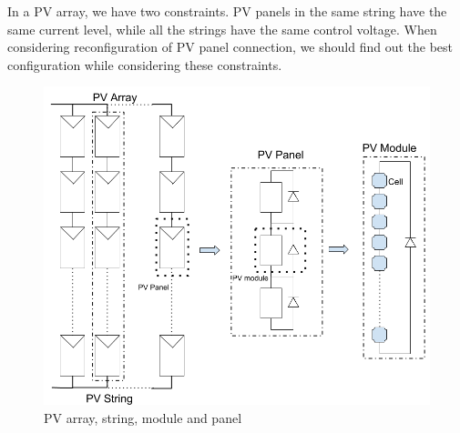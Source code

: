 \documentclass[conference]{pvsctran}
\begin{document}
In a PV array, we have two constraints. 
PV panels in the same string have the same current level, while all the strings have the same control voltage. 
When considering reconfiguration of PV panel connection, we should find out the best configuration while considering these constraints. 

\begin{figure}[t]
    \centering
    \includegraphics[width=0.8\linewidth]{module.png}
    \caption{PV array, string, module and panel}
    \label{model}
\end{figure}
\end{document}
